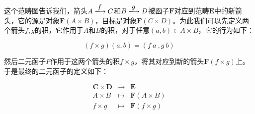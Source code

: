 \documentclass{article}
\begin{document}
这个范畴图告诉我们，箭头$A \arrowto{f} C$和$B \arrowto{g} D$被函子$\mathbf{F}$对应到范畴$\pmb{E}$中的新箭头，它的源是对象$\mathbf{F}(A \times B)$，目标是对象$\mathbf{F}(C \times D)$。为此我们可以先定义两个箭头$f, g$的积，它作用于$A$和$B$的积，对于任意$(a, b) \in A \times B$，它的行为如下：

\[
(f \times g)(a, b) = (f\ a\ , g\ b)
\]

然后二元函子$F$作用于这两个箭头的积$f \times g$，将其对应到新的箭头$\mathbf{F}(f \times g)$上。于是最终的二元函子的定义如下：

\[
\begin{array}{rcl}
\pmb{C} \times \pmb{D} & \longrightarrow & \pmb{E} \\
A \times B & \longmapsto & \mathbf{F}(A \times B) \\
f \times g & \longmapsto & \mathbf{F}(f \times g) \\
\end{array}
\]
\end{document}
